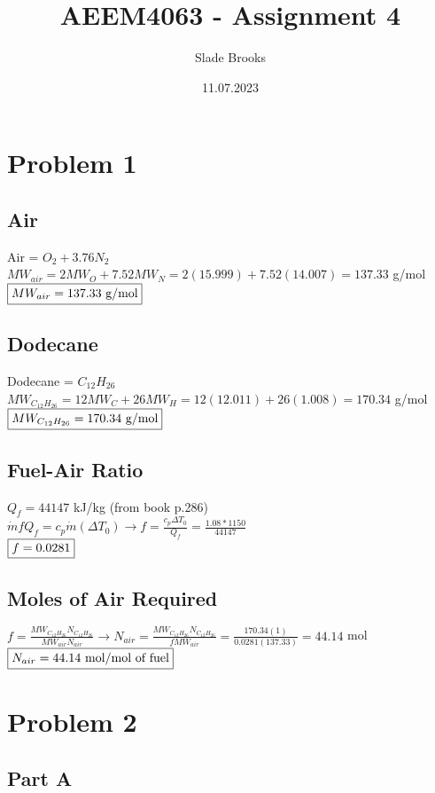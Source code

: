 \documentclass{article}
\title{AEEM4063 - Assignment 4}
\author{Slade Brooks}
\date{11.07.2023}
\begin{document}
\maketitle

\section*{Problem 1}
\subsection*{Air}
Air = $O_2 + 3.76N_2$ \\
$MW_{air}=2MW_O+7.52MW_N=2(15.999)+7.52(14.007)=137.33$ g/mol \\
$\fbox{$MW_{air}=137.33$ g/mol}$ 

\subsection*{Dodecane}
Dodecane = $C_{12}H_{26}$ \\
$MW_{C_{12}H_{26}}=12MW_C+26MW_H=12(12.011)+26(1.008)=170.34$ g/mol \\
$\fbox{$MW_{C_{12}H_{26}}=170.34$ g/mol}$

\subsection*{Fuel-Air Ratio}
$Q_{f}=44147$ kJ/kg (from book p.286) \\
$\dot{m}fQ_f=c_p\dot{m}(\Delta T_0) \rightarrow f=\frac{c_p \Delta T_0}{Q_f}=\frac{1.08*1150}{44147}$ \\
$\fbox{$f=0.0281$}$

\subsection*{Moles of Air Required}
$f=\frac{MW_{C_{12}H_{26}}N_{C_{12}H_{26}}}{MW_{air}N_{air}} \rightarrow
N_{air}=\frac{MW_{C_{12}H_{26}}N_{C_{12}H_{26}}}{fMW_{air}}=\frac{170.34(1)}{0.0281(137.33)}=
44.14$ mol \\
$\fbox{$N_{air}=44.14$ mol/mol of fuel}$

\section*{Problem 2}
\subsection*{Part A}
\end{document}

